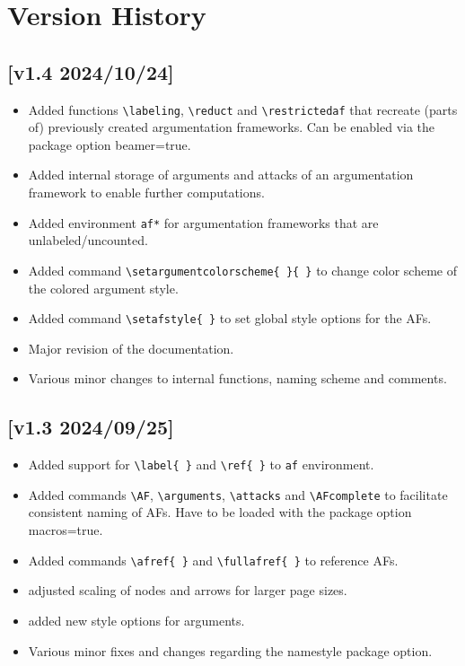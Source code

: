 \documentclass[headings=normal]{scrartcl}
\begin{document}
\newpage
\section{Version History}\label{sec:history}
\subsection*{[v1.4 2024/10/24]}
\begin{itemize}
    \item Added functions \verb|\labeling|, \verb|\reduct| and \verb|\restrictedaf| that recreate (parts of) previously created argumentation frameworks. Can be enabled via the package option \textsf{beamer=true}.
    \item Added internal storage of arguments and attacks of an argumentation framework to enable further computations.
    \item Added environment \verb|af*| for argumentation frameworks that are unlabeled/uncounted.
    \item Added command \verb|\setargumentcolorscheme{ }{ }| to change color scheme of the \textsf{colored} argument style.
    \item Added command \verb|\setafstyle{ }| to set global style options for the AFs.
    \item Major revision of the documentation.
    \item Various minor changes to internal functions, naming scheme and comments.
\end{itemize}
\subsection*{[v1.3 2024/09/25]}
\begin{itemize}
    \item Added support for \verb|\label{ }| and \verb|\ref{ }| to \texttt{af} environment.
    \item Added commands \verb|\AF|, \verb|\arguments|, \verb|\attacks| and \verb|\AFcomplete| to facilitate consistent naming of AFs. Have to be loaded with the package option \textsf{macros=true}.
    \item Added commands \verb|\afref{ }| and \verb|\fullafref{ }| to reference AFs.
    \item adjusted scaling of nodes and arrows for larger page sizes.
    \item added new style options for arguments.
    \item Various minor fixes and changes regarding the \textsf{namestyle} package option.
\end{itemize}
\end{document}
